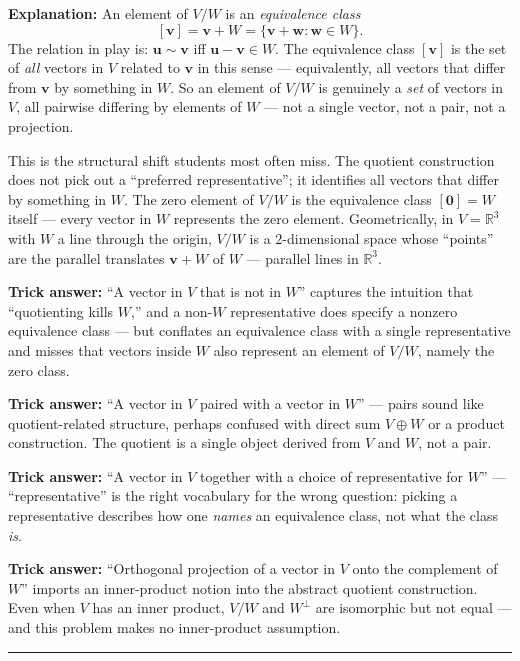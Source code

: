 \documentclass[12pt]{amsart}
\newcommand{\divider}{
  \vspace{-1em}
  \noindent
  \raisebox{-0.15ex}{\textbullet}%
  \hspace{0.5em}%
  \rule[0.5ex]{0.95\textwidth}{1.0pt}%
  \hspace{0.5em}%
  \raisebox{-0.15ex}{\textbullet}%
  \vspace{0em}
}
\begin{document}
\textbf{Explanation:}
An element of $V/W$ is an \emph{equivalence class}
$$[\mathbf{v}] = \mathbf{v} + W = \{\mathbf{v} + \mathbf{w} : \mathbf{w} \in W\}.$$
The relation in play is: $\mathbf{u} \sim \mathbf{v}$ iff $\mathbf{u} - \mathbf{v} \in W$.
The equivalence class $[\mathbf{v}]$ is the set of \emph{all} vectors in $V$
related to $\mathbf{v}$ in this sense --- equivalently, all vectors that
differ from $\mathbf{v}$ by something in $W$. So an element of $V/W$ is
genuinely a \emph{set} of vectors in $V$, all pairwise differing by elements
of $W$ --- not a single vector, not a pair, not a projection.

This is the structural shift students most often miss. The quotient
construction does not pick out a ``preferred representative''; it identifies
all vectors that differ by something in $W$. The zero element of $V/W$ is
the equivalence class $[\mathbf{0}] = W$ itself --- every vector in $W$
represents the zero element. Geometrically, in $V = \mathbb{R}^3$ with $W$
a line through the origin, $V/W$ is a $2$-dimensional space whose
``points'' are the parallel translates $\mathbf{v} + W$ of $W$ ---
parallel lines in $\mathbb{R}^3$.

\textbf{Trick answer:}
``A vector in $V$ that is not in $W$'' captures the intuition that
``quotienting kills $W$,'' and a non-$W$ representative does specify a
nonzero equivalence class --- but conflates an equivalence class with a
single representative and misses that vectors inside $W$ also represent
an element of $V/W$, namely the zero class.

\textbf{Trick answer:}
``A vector in $V$ paired with a vector in $W$'' --- pairs sound like
quotient-related structure, perhaps confused with direct sum $V \oplus W$ or
a product construction. The quotient is a single object derived from $V$ and
$W$, not a pair.

\textbf{Trick answer:}
``A vector in $V$ together with a choice of representative for $W$'' ---
``representative'' is the right vocabulary for the wrong question: picking
a representative describes how one \emph{names} an equivalence class, not
what the class \emph{is}.

\textbf{Trick answer:}
``Orthogonal projection of a vector in $V$ onto the complement of $W$''
imports an inner-product notion into the abstract quotient construction.
Even when $V$ has an inner product, $V/W$ and $W^\perp$ are isomorphic but
not equal --- and this problem makes no inner-product assumption.

\divider
\end{document}
